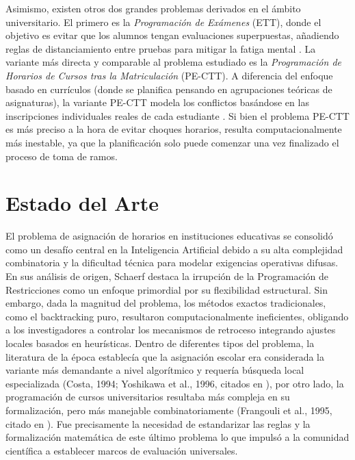 \documentclass[letter, 10pt]{article}
\begin{document}
Asimismo, existen otros dos grandes problemas derivados en el ámbito universitario. El primero es la \textit{Programación de Exámenes} (ETT), donde el objetivo es evitar que los alumnos tengan evaluaciones superpuestas, añadiendo reglas de distanciamiento entre pruebas para mitigar la fatiga mental \cite{ceschia2023}. La variante más directa y comparable al problema estudiado es la \textit{Programación de Horarios de Cursos tras la Matriculación} (PE-CTT). A diferencia del enfoque basado en currículos (donde se planifica pensando en agrupaciones teóricas de asignaturas), la variante PE-CTT modela los conflictos basándose en las inscripciones individuales reales de cada estudiante \cite{ceschia2023}. Si bien el problema PE-CTT es más preciso a la hora de evitar choques horarios, resulta computacionalmente más inestable, ya que la planificación solo puede comenzar una vez finalizado el proceso de toma de ramos.

\section{Estado del Arte}

El problema de asignación de horarios en instituciones educativas se consolidó como un desafío central en la Inteligencia Artificial debido a su alta complejidad combinatoria y la dificultad técnica para modelar exigencias operativas difusas. En sus análisis de origen, Schaerf \cite{schaerf1999} destaca la irrupción de la Programación de Restricciones como un enfoque primordial por su flexibilidad estructural. Sin embargo, dada la magnitud del problema, los métodos exactos tradicionales, como el backtracking puro, resultaron computacionalmente ineficientes, obligando a los investigadores a controlar los mecanismos de retroceso integrando ajustes locales basados en heurísticas. Dentro de diferentes tipos del problema, la literatura de la época establecía que la asignación escolar era considerada la variante más demandante a nivel algorítmico y requería búsqueda local especializada (Costa, 1994; Yoshikawa et al., 1996, citados en \cite{schaerf1999}), por otro lado, la programación de cursos universitarios resultaba más compleja en su formalización, pero más manejable combinatoriamente (Frangouli et al., 1995, citado en \cite{schaerf1999}). Fue precisamente la necesidad de estandarizar las reglas y la formalización matemática de este último problema lo que impulsó a la comunidad científica a establecer marcos de evaluación universales. 
\end{document}

